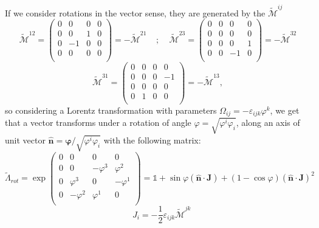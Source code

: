 \documentclass[12pt]{article}
\begin{document}
If we consider rotations in the vector sense, they are generated by the $\tilde{\mathcal{M}}^{ij}$
\[
    \tilde{\mathcal{M}}^{12} = \begin{pmatrix} 
                                    0 & 0  & 0 & 0 \\ 
                                    0 & 0  & 1 & 0 \\
                                    0 & -1 & 0 & 0 \\
                                    0 & 0  & 0 & 0 \\
                               \end{pmatrix} = -\tilde{\mathcal{M}}^{21}
~~~~~;~~~~~
\tilde{\mathcal{M}}^{23} = \begin{pmatrix} 
                                    0 & 0  & 0 & 0 \\ 
                                    0 & 0  & 0 & 0 \\
                                    0 & 0  & 0 & 1 \\
                                    0 & 0  & -1 & 0 \\
                               \end{pmatrix} = -\tilde{\mathcal{M}}^{32}
\]
\[
\tilde{\mathcal{M}}^{31} = \begin{pmatrix} 
                                    0 & 0  & 0 & 0 \\ 
                                    0 & 0  & 0 & -1 \\
                                    0 & 0  & 0 & 0 \\
                                    0 & 1  & 0 & 0 \\
                               \end{pmatrix} = -\tilde{\mathcal{M}}^{13},
\]
so considering a Lorentz transformation with parameters $\Omega_{ij}=-\varepsilon_{ijk}\varphi^{k}$, we get that a vector transforms under a rotation of angle $\varphi = \sqrt{\varphi^i\varphi_i}$, along an axis of unit vector $\hat{\mathbf{n}}=\bm{\varphi}/\sqrt{\varphi^i\varphi_i}$ with the following matrix:
\[
    \tilde{\Lambda}_{rot} = \exp{\begin{pmatrix} 
                                    0 & 0  & 0 & 0 \\ 
                                    0 & 0  & -\varphi^3 & \varphi^2 \\
                                    0 & \varphi^3  & 0 & -\varphi^1 \\
                                    0 & -\varphi^2  & \varphi^1 & 0 \\
                                \end{pmatrix}
                            } = \mathbb{1} + \sin{\varphi}(\hat{\mathbf{n}}\cdot\mathbf{J})+(1-\cos\varphi)(\hat{\mathbf{n}}\cdot\mathbf{J})^2
\]
\[
    ~~~~ J_i = -\frac{1}{2}\varepsilon_{ijk}\tilde{\mathcal{M}}^{jk}
\]
\end{document}

